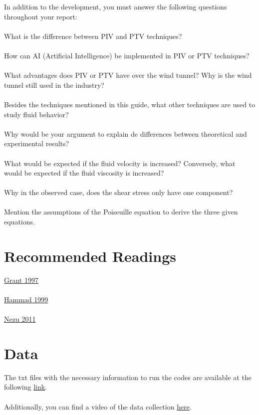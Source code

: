\documentclass{article} %
\begin{document}
In addition to the development, you must answer the following questions throughout your report:
\\ \\
What is the difference between PIV and PTV techniques?
\\ \\
How can AI (Artificial Intelligence) be implemented in PIV or PTV techniques?
\\ \\
What advantages does PIV or PTV have over the wind tunnel? Why is the wind tunnel still used in the industry?
\\ \\
Besides the techniques mentioned in this guide, what other techniques are used to study fluid behavior?
\\ \\
Why would be your argument to explain de differences between theoretical and experimental results?
\\ \\
What would be expected if the fluid velocity is increased? Conversely, what would be expected if the fluid viscosity is increased?
\\ \\
Why in the observed case, does the shear stress only have one component?
\\ \\
Mention the assumptions of the Poiseuille equation to derive the three given equations.


\section{Recommended Readings}

\href{https://github.com/LukasWolff2002/Lab_2_FM/blob/main/LECTURAS/Grant_1997.pdf}{Grant 1997}
\\ \\
\href{https://github.com/LukasWolff2002/Lab_2_FM/blob/main/LECTURAS/Hammad_1999.pdf}{Hammad 1999}
\\ \\
\href{https://github.com/LukasWolff2002/Lab_2_FM/blob/main/LECTURAS/Nezu_2011.pdf}{Nezu 2011}

\section{Data}

The txt files with the necessary information to run the codes are available at the following \href{https://github.com/LukasWolff2002/Lab_2_FM/tree/main/DATOS}{link}.
\\ \\
Additionally, you can find a video of the data collection \href{https://github.com/LukasWolff2002/Lab_2_FM/blob/main/VIDEOS/VIDEO_CANAL.mp4}{here}.
\end{document}
